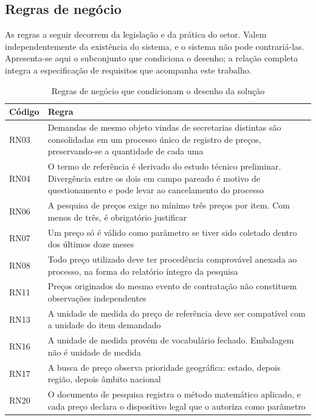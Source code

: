 
\subsection{Regras de negócio}
\label{subsec:regras-de-negocio}

As regras a seguir decorrem da legislação e da prática do setor. Valem
independentemente da existência do sistema, e o sistema não pode contrariá-las.
Apresenta-se aqui o subconjunto que condiciona o desenho; a relação completa
integra a especificação de requisitos que acompanha este trabalho.

\begin{table}[H]
  \centering
  \caption{Regras de negócio que condicionam o desenho da solução}
  \label{tab:regras-de-negocio}
  \begin{ufopaespacosimples}
  \small
  \begin{tabularx}{\textwidth}{@{}lX@{}}
    \toprule
    \textbf{Código} & \textbf{Regra} \\
    \midrule
    RN03 & Demandas de mesmo objeto vindas de secretarias distintas são
      consolidadas em um processo único de registro de preços, preservando-se a
      quantidade de cada uma \\
    RN04 & O termo de referência é derivado do estudo técnico preliminar.
      Divergência entre os dois em campo pareado é motivo de questionamento e
      pode levar ao cancelamento do processo \\
    RN06 & A pesquisa de preços exige no mínimo três preços por item. Com menos
      de três, é obrigatório justificar \\
    RN07 & Um preço só é válido como parâmetro se tiver sido coletado dentro dos
      últimos doze meses \\
    RN08 & Todo preço utilizado deve ter procedência comprovável anexada ao
      processo, na forma do relatório íntegro da pesquisa \\
    RN11 & Preços originados do mesmo evento de contratação não constituem
      observações independentes \\
    RN13 & A unidade de medida do preço de referência deve ser compatível com a
      unidade do item demandado \\
    RN16 & A unidade de medida provém de vocabulário fechado. Embalagem não é
      unidade de medida \\
    RN17 & A busca de preço observa prioridade geográfica: estado, depois
      região, depois âmbito nacional \\
    RN20 & O documento de pesquisa registra o método matemático aplicado, e cada
      preço declara o dispositivo legal que o autoriza como parâmetro \\
    \bottomrule
  \end{tabularx}
  \end{ufopaespacosimples}
\end{table}

